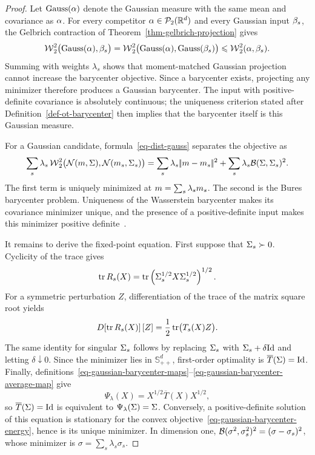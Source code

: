 \begin{proof}
	Let $\operatorname{Gauss}(\alpha)$ denote the Gaussian measure with the same mean and covariance as $\alpha$. For every competitor $\alpha\in\mathcal{P}_2(\mathbb{R}^d)$ and every Gaussian input $\beta_s$, the Gelbrich contraction of Theorem~\ref{thm-gelbrich-projection} gives
	\[
		\operatorname{\mathcal{W}}_2^2\bigl(\operatorname{Gauss}(\alpha),\beta_s\bigr)
		=
		\operatorname{\mathcal{W}}_2^2\bigl(\operatorname{Gauss}(\alpha),\operatorname{Gauss}(\beta_s)\bigr)
		\leqslant
		\operatorname{\mathcal{W}}_2^2(\alpha,\beta_s).
	\]
	Summing with weights $\lambda_s$ shows that moment-matched Gaussian projection cannot increase the barycenter objective. Since a barycenter exists, projecting any minimizer therefore produces a Gaussian barycenter. The input with positive-definite covariance is absolutely continuous; the uniqueness criterion stated after Definition~\ref{def-ot-barycenter} then implies that the barycenter itself is this Gaussian measure.

	For a Gaussian candidate, formula~\eqref{eq-dist-gauss} separates the objective as
	\[
		\sum_s\lambda_s\operatorname{\mathcal{W}}_2^2\bigl(\mathcal{N}(m,\Sigma),\mathcal{N}(m_s,\Sigma_s)\bigr)
		=
		\sum_s\lambda_s|\!| m-m_s |\!|^2
		+
		\sum_s\lambda_s\mathcal{B}(\Sigma,\Sigma_s)^2.
	\]
	The first term is uniquely minimized at $m=\sum_s\lambda_sm_s$. The second is the Bures barycenter problem. Uniqueness of the Wasserstein barycenter makes its covariance minimizer unique, and the presence of a positive-definite input makes this minimizer positive definite~\cite{alvarez2016fixed,bhatia2018bures}.

	It remains to derive the fixed-point equation. First suppose that $\Sigma_s\succ0$. Cyclicity of the trace gives
	\[
		\operatorname{tr} R_s(X)
		=
		\operatorname{tr}\left( \Sigma_s^{1/2}X\Sigma_s^{1/2} \right)^{1/2}.
	\]
	For a symmetric perturbation $Z$, differentiation of the trace of the matrix square root yields
	\[
		D\!\left[\operatorname{tr} R_s(X)\right][Z]
		=
		\frac12\operatorname{tr}\bigl(T_s(X)Z\bigr).
	\]
	The same identity for singular $\Sigma_s$ follows by replacing $\Sigma_s$ with $\Sigma_s+\delta\mathrm{Id}$ and letting $\delta\downarrow0$. Since the minimizer lies in $\mathbb S_{++}^d$, first-order optimality is $\overline T(\Sigma)=\mathrm{Id}$. Finally, definitions~\eqref{eq-gaussian-barycenter-maps}--\eqref{eq-gaussian-barycenter-average-map} give
	\[
		\Psi_\lambda(X)
		=
		X^{1/2}\overline T(X)X^{1/2},
	\]
	so $\overline T(\Sigma)=\mathrm{Id}$ is equivalent to $\Psi_\lambda(\Sigma)=\Sigma$. Conversely, a positive-definite solution of this equation is stationary for the convex objective~\eqref{eq-gaussian-barycenter-energy}, hence is its unique minimizer. In dimension one, $\mathcal{B}(\sigma^2,\sigma_s^2)^2=(\sigma-\sigma_s)^2$, whose minimizer is $\sigma=\sum_s\lambda_s\sigma_s$.
\end{proof}

